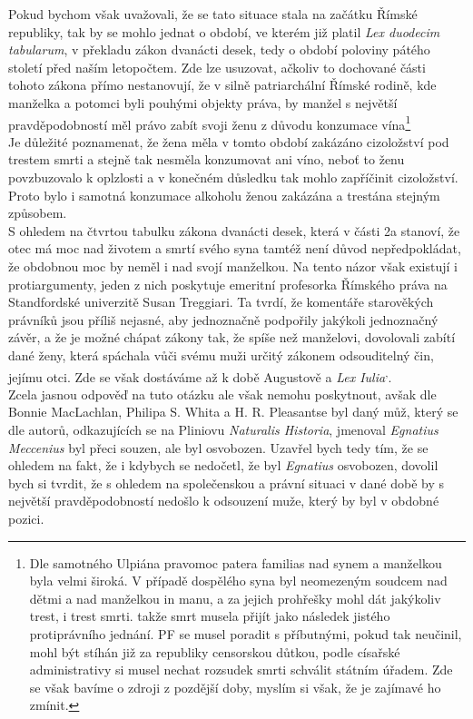 \documentclass{article}
\begin{document}
Pokud bychom však uvažovali, že se tato situace stala na začátku Římské republiky, tak by se mohlo jednat o období, ve kterém již platil \textit{Lex duodecim tabularum}, v překladu zákon dvanácti desek, tedy o období poloviny pátého století před naším letopočtem. Zde lze usuzovat, ačkoliv to dochované části tohoto zákona přímo nestanovují, že v silně patriarchální Římské rodině, kde manželka a potomci byli pouhými objekty práva, by manžel s největší pravděpodobností měl právo zabít svoji ženu z důvodu konzumace vína\footnote{Dle samotného Ulpiána pravomoc patera familias nad synem a manželkou byla velmi široká. V případě dospělého syna byl neomezeným soudcem nad dětmi a nad manželkou in manu, a za jejich prohřešky mohl dát jakýkoliv trest, i trest smrti. takže smrt musela přijít jako následek jistého protiprávního jednání. PF se musel poradit s příbutnými, pokud tak neučinil, mohl být stíhán již za republiky censorskou důtkou, podle císařské administrativy si musel nechat rozsudek smrti schválit státním úřadem. Zde se však bavíme o zdroji z pozdější doby, myslím si však, že je zajímavé ho zmínit.}\\

Je důležité poznamenat, že žena měla v tomto období zakázáno cizoložství pod trestem smrti a stejně tak nesměla konzumovat ani víno, neboť to ženu povzbuzovalo k oplzlosti a v konečném důsledku tak mohlo zapříčinit cizoložství. Proto bylo i samotná konzumace alkoholu ženou zakázána a trestána stejným způsobem.\\

S ohledem na čtvrtou tabulku zákona dvanácti desek, která v části 2a stanoví, že otec má moc nad životem a smrtí svého syna tamtéž není důvod nepředpokládat, že obdobnou moc by neměl i nad svojí manželkou. Na tento názor však existují i protiargumenty, jeden z nich poskytuje emeritní profesorka Římského práva na Standfordské univerzitě Susan Treggiari. Ta tvrdí, že komentáře starověkých právníků jsou příliš nejasné, aby jednoznačně podpořily jakýkoli jednoznačný závěr, a že je možné chápat zákony tak, že spíše než manželovi, dovolovali zabítí dané ženy, která spáchala vůči svému muži určitý zákonem odsouditelný čin, jejímu otci. Zde se však dostáváme až k době Augustově a \textit{Lex Iulia}\textsuperscript{,}.\\

Zcela jasnou odpověď na tuto otázku ale však nemohu poskytnout, avšak dle Bonnie MacLachlan, Philipa S. Whita a H. R. Pleasantse byl daný můž, který se dle autorů, odkazujících se na Pliniovu \textit{Naturalis Historia}, jmenoval \textit{Egnatius Meccenius} byl přeci souzen, ale byl osvobozen. Uzavřel bych tedy tím, že se ohledem na fakt, že i kdybych se nedočetl, že byl \textit{Egnatius} osvobozen, dovolil bych si tvrdit, že s ohledem na společenskou a právní situaci v dané době by s největší pravděpodobností nedošlo k odsouzení muže, který by byl v obdobné pozici.
\end{document}
